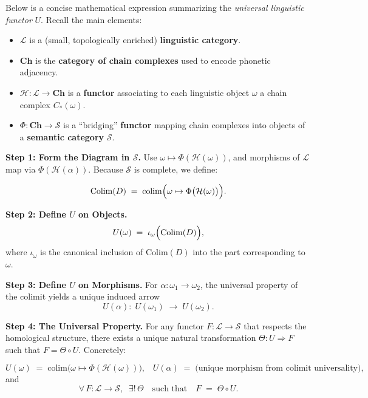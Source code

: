 \documentclass[11pt]{article}
\theoremstyle{definition}
\theoremstyle{remark}
\begin{document}
Below is a concise mathematical expression summarizing the \emph{universal linguistic functor} \(U\). Recall the main elements:

\begin{itemize}
    \item \(\mathcal{L}\) is a (small, topologically enriched) \textbf{linguistic category}.
    \item \(\mathbf{Ch}\) is the \textbf{category of chain complexes} used to encode phonetic adjacency.
    \item \(\mathcal{H} : \mathcal{L} \to \mathbf{Ch}\) is a \textbf{functor} associating to each linguistic object \(\omega\) a chain complex \(C_\ast(\omega)\).
    \item \(\Phi : \mathbf{Ch} \to \mathcal{S}\) is a “bridging” \textbf{functor} mapping chain complexes into objects of a \textbf{semantic category} \(\mathcal{S}\).
\end{itemize}

\noindent
\textbf{Step 1: Form the Diagram in \(\mathcal{S}\).}  
Use \(\omega \mapsto \Phi(\mathcal{H}(\omega))\), and morphisms of \(\mathcal{L}\) map via \(\Phi(\mathcal{H}(\alpha))\). Because \(\mathcal{S}\) is complete, we define:

\[
\mathrm{Colim}(D) 
\;=\;
\mathrm{colim}\Bigl(\omega \mapsto \Phi\bigl(\mathcal{H}(\omega)\bigr)\Bigr).
\]

\noindent
\textbf{Step 2: Define \(U\) on Objects.}  
\[
U(\omega) 
\;=\; 
\iota_\omega \Bigl(\mathrm{Colim}(D)\Bigr),
\]
where \(\iota_\omega\) is the canonical inclusion of \(\mathrm{Colim}(D)\) into the part corresponding to \(\omega\).

\noindent
\textbf{Step 3: Define \(U\) on Morphisms.}  
For \(\alpha: \omega_1 \to \omega_2\), the universal property of the colimit yields a unique induced arrow
\[
U(\alpha) 
:\;
U(\omega_1) 
\;\longrightarrow\;
U(\omega_2).
\]

\noindent
\textbf{Step 4: The Universal Property.}  
For any functor \(F:\mathcal{L}\to\mathcal{S}\) that respects the homological structure, there exists a unique natural transformation \(\Theta : U \Rightarrow F\) such that \(F = \Theta \circ U\). Concretely:

\[
\boxed{
U(\omega)
\;=\;
\mathrm{colim}\!\bigl(\omega \mapsto \Phi(\mathcal{H}(\omega))\bigr),
\;\;\;
U(\alpha)
\;=\;
\text{(unique morphism from colimit universality),}
}
\]
and
\[
\boxed{
\forall\,F:\mathcal{L}\to\mathcal{S},
\;\;\exists!\,\Theta 
\quad
\text{such that}
\quad
F \;=\; \Theta \circ U.
}
\]
\end{document}
